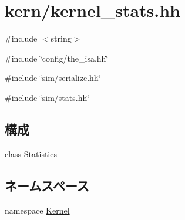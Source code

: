 \hypertarget{kern_2kernel__stats_8hh}{
\section{kern/kernel\_\-stats.hh}
\label{kern_2kernel__stats_8hh}
}
{\ttfamily \#include $<$string$>$}\par
{\ttfamily \#include \char`\"{}config/the\_\-isa.hh\char`\"{}}\par
{\ttfamily \#include \char`\"{}sim/serialize.hh\char`\"{}}\par
{\ttfamily \#include \char`\"{}sim/stats.hh\char`\"{}}\par
\subsection*{構成}
\begin{DoxyCompactItemize}
\item 
class \hyperlink{classKernel_1_1Statistics}{Statistics}
\end{DoxyCompactItemize}
\subsection*{ネームスペース}
\begin{DoxyCompactItemize}
\item 
namespace \hyperlink{namespaceKernel}{Kernel}
\end{DoxyCompactItemize}
